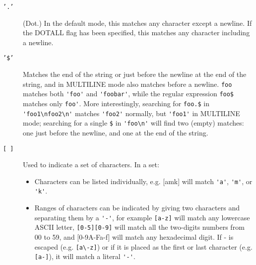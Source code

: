 \begin{description}

\item[\texttt{'.'}]
(Dot.) In the default mode, this matches
any character except a newline. If the
DOTALL flag has been specified, this matches
any character including a newline.

\item[\texttt{'\$'}]
Matches the end of the string or just
before the newline at the end of the string,
and in MULTILINE mode also matches before
a newline. \verb+foo+ matches both \verb+'foo'+ and
\verb+'foobar'+, while the regular expression
\verb+foo$+ matches only \verb+foo'+. More interestingly,
searching for \verb+foo.$+ in \verb+'foo1\nfoo2\n'+
matches \verb+'foo2'+ normally, but \verb+'foo1'+ in
MULTILINE mode; searching for a single
\verb+$+ in \verb+'foo\n'+ will find two (empty) matches:
one just before the newline, and one at the end of the string.

\pagebreak
\item[\texttt{[ ]}]
Used to indicate a set of characters. In a set:

\begin{itemize}
\item Characters can be listed individually,
e.g. [amk] will match \verb+'a'+, \verb+'m'+, or \verb+'k'+.

\item Ranges of characters can be indicated
by giving two characters and separating
them by a \verb+'-'+, for example \verb+[a-z]+ will
match any lowercase ASCII letter, \verb+[0-5][0-9]+
will match all the two-digits numbers
from 00 to 59, and [0-9A-Fa-f] will match
any hexadecimal digit. If - is escaped
(e.g. \verb+[a\-z]+) or if it is placed as the
first or last character (e.g. \verb+[a-]+),
it will match a literal \verb+'-'+.
\end{itemize}

\end{description}

